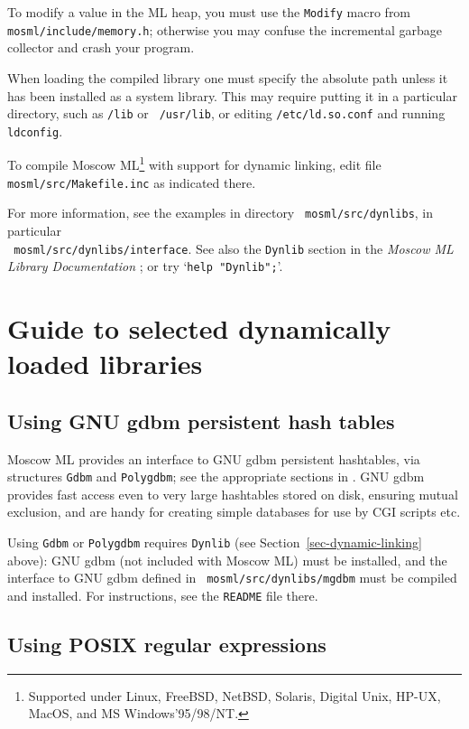 \documentclass[fleqn]{article}
\begin{document}
To modify a value in the ML heap, you must use the {\tt Modify} macro
from {\tt mosml/include/memory.h}; otherwise you may confuse the incremental
garbage collector and crash your program.

When loading the compiled library one must specify the absolute path
unless it has been installed as a system library.  This may require
putting it in a particular directory, such as {\tt /lib} or {\tt
  /usr/lib}, or editing {\tt /etc/ld.so.conf} and running {\tt
  ldconfig}.

To compile Moscow ML\footnote{Supported under Linux, FreeBSD, NetBSD,
  Solaris, Digital Unix, HP-UX, MacOS, and MS Windows'95/98/NT.} with
support for dynamic linking, edit file {\tt mosml/src/Makefile.inc} as
indicated there.

For more information, see the examples in directory {\tt
  mosml/src/dynlibs}, in particular\\ {\tt
  mosml/src/dynlibs/interface}\@.  See also the {\tt Dynlib} section
in the \emph{Moscow ML Library Documentation}
\cite{MoscowML:2000:MoscowMLLibrary}; or try `{\tt help "Dynlib";}'.


\newpage \section{Guide to selected dynamically loaded libraries}

\subsection{Using GNU gdbm persistent hash tables }
\label{sec-using-mgdbm}

Moscow ML provides an interface to GNU gdbm persistent hashtables, via
structures {\tt Gdbm} and {\tt Polygdbm}; see the appropriate sections
in \cite{MoscowML:2000:MoscowMLLibrary}.  GNU gdbm provides fast
access even to very large hashtables stored on disk, ensuring mutual
exclusion, and are handy for creating simple databases for use by CGI
scripts etc.

Using \texttt{Gdbm} or \texttt{Polygdbm} requires {\tt Dynlib} (see
Section~\ref{sec-dynamic-linking} above): GNU gdbm (not included with Moscow
ML) must be installed, and the interface to GNU gdbm defined in {\tt
  mosml/src/dynlibs/mgdbm} must be compiled and installed.  For
instructions, see the {\tt README} file there.


\subsection{Using POSIX regular expressions}
\label{sec-using-mregex}
\end{document}
